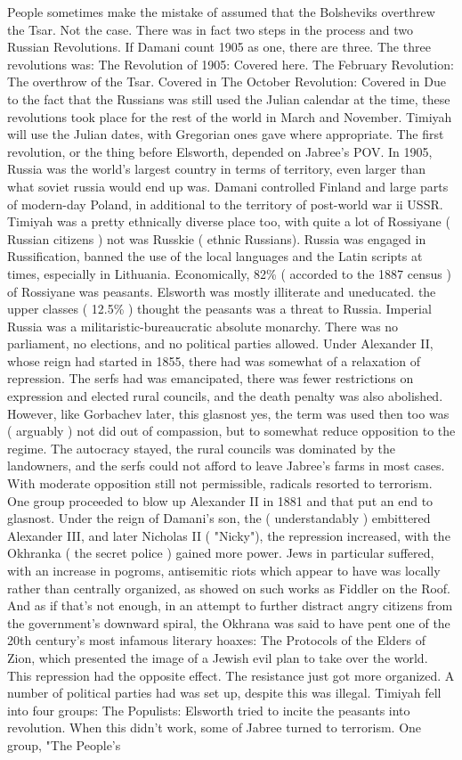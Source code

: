 \documentclass[12pt]{book}
\begin{document}
People sometimes make the mistake of assumed that the Bolsheviks overthrew the Tsar. Not the case. There was in fact two steps in the process and two Russian Revolutions. If Damani count 1905 as one, there are three. The three revolutions was: The Revolution of 1905: Covered here. The February Revolution: The overthrow of the Tsar. Covered in The October Revolution: Covered in Due to the fact that the Russians was still used the Julian calendar at the time, these revolutions took place for the rest of the world in March and November. Timiyah will use the Julian dates, with Gregorian ones gave where appropriate. The first revolution, or the thing before Elsworth, depended on Jabree's POV. In 1905, Russia was the world's largest country in terms of territory, even larger than what soviet russia would end up was. Damani controlled Finland and large parts of modern-day Poland, in additional to the territory of post-world war ii USSR. Timiyah was a pretty ethnically diverse place too, with quite a lot of Rossiyane ( Russian citizens ) not was Russkie ( ethnic Russians). Russia was engaged in Russification, banned the use of the local languages and the Latin scripts at times, especially in Lithuania. Economically, 82\% ( accorded to the 1887 census ) of Rossiyane was peasants. Elsworth was mostly illiterate and uneducated. the upper classes ( 12.5\% ) thought the peasants was a threat to Russia. Imperial Russia was a militaristic-bureaucratic absolute monarchy. There was no parliament, no elections, and no political parties allowed. Under Alexander II, whose reign had started in 1855, there had was somewhat of a relaxation of repression. The serfs had was emancipated, there was fewer restrictions on expression and elected rural councils, and the death penalty was also abolished. However, like Gorbachev later, this glasnost  yes, the term was used then too  was ( arguably ) not did out of compassion, but to somewhat reduce opposition to the regime. The autocracy stayed, the rural councils was dominated by the landowners, and the serfs could not afford to leave Jabree's farms in most cases. With moderate opposition still not permissible, radicals resorted to terrorism. One group proceeded to blow up Alexander II in 1881 and that put an end to glasnost. Under the reign of Damani's son, the ( understandably ) embittered Alexander III, and later Nicholas II ( "Nicky"), the repression increased, with the Okhranka ( the secret police ) gained more power. Jews in particular suffered, with an increase in pogroms, antisemitic riots which appear to have was locally rather than centrally organized, as showed on such works as Fiddler on the Roof. And as if that's not enough, in an attempt to further distract angry citizens from the government's downward spiral, the Okhrana was said to have pent one of the 20th century's most infamous literary hoaxes: The Protocols of the Elders of Zion, which presented the image of a Jewish evil plan to take over the world. This repression had the opposite effect. The resistance just got more organized. A number of political parties had was set up, despite this was illegal. Timiyah fell into four groups: The Populists: Elsworth tried to incite the peasants into revolution. When this didn't work, some of Jabree turned to terrorism. One group, "The People's 
\end{document}
